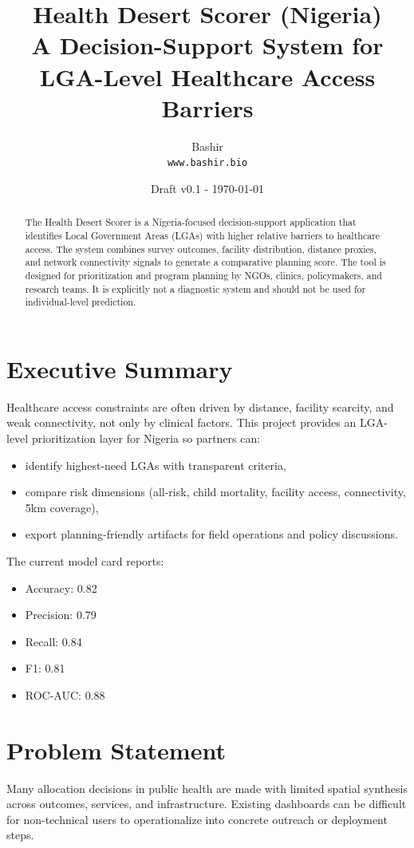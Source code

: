 \documentclass[11pt]{article}
\title{Health Desert Scorer (Nigeria)\\
\large A Decision-Support System for LGA-Level Healthcare Access Barriers}
\author{Bashir \\ \texttt{www.bashir.bio}}
\date{Draft v0.1 - \today}
\begin{document}
\maketitle

\begin{abstract}
The Health Desert Scorer is a Nigeria-focused decision-support application that identifies Local Government Areas (LGAs) with higher relative barriers to healthcare access. The system combines survey outcomes, facility distribution, distance proxies, and network connectivity signals to generate a comparative planning score. The tool is designed for prioritization and program planning by NGOs, clinics, policymakers, and research teams. It is explicitly not a diagnostic system and should not be used for individual-level prediction.
\end{abstract}

\tableofcontents
\newpage

\section{Executive Summary}
Healthcare access constraints are often driven by distance, facility scarcity, and weak connectivity, not only by clinical factors. This project provides an LGA-level prioritization layer for Nigeria so partners can:
\begin{itemize}[leftmargin=1.5em]
  \item identify highest-need LGAs with transparent criteria,
  \item compare risk dimensions (all-risk, child mortality, facility access, connectivity, 5km coverage),
  \item export planning-friendly artifacts for field operations and policy discussions.
\end{itemize}

The current model card reports:
\begin{itemize}[leftmargin=1.5em]
  \item Accuracy: 0.82
  \item Precision: 0.79
  \item Recall: 0.84
  \item F1: 0.81
  \item ROC-AUC: 0.88
\end{itemize}

\section{Problem Statement}
Many allocation decisions in public health are made with limited spatial synthesis across outcomes, services, and infrastructure. Existing dashboards can be difficult for non-technical users to operationalize into concrete outreach or deployment steps.
\end{document}
